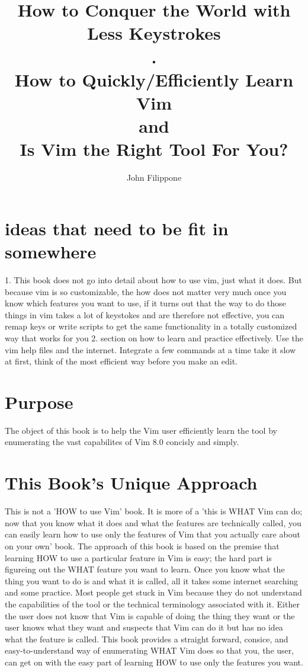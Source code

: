 \documentclass[12pt]{book}
\title{How to Conquer the World with Less Keystrokes \\.\\\large How to Quickly/Efficiently Learn Vim \\\large and \\\large Is Vim the Right Tool For You?}
\author{John Filippone}
\begin{document}
\maketitle

\section{ideas that need to be fit in somewhere}
1. This book does not go into detail about how to use vim, just what it does.  
But because vim is so customizable, the how does not matter very much
once you know which features you want to use, if it turns out that the way to do those things in vim takes a lot of keystokes and are therefore
not effective, you can remap keys or write scripts to get the same functionality in a totally customized way that works for you
2. section on how to learn and practice effectively.
Use the vim help files and the internet.
Integrate a few commands at a time take it slow at first, think of the most efficient way before you make an edit.

\section{Purpose}
The object of this book is to help the Vim user efficiently learn the tool by enumerating the vast capabilites of Vim 8.0 concisly and simply.  

\section{This Book's Unique Approach}
This is not a 'HOW to use Vim' book. 
It is more of a 'this is WHAT Vim can do; now that you know what it does and what the features are technically called, you can easily learn how to use only the features of Vim 
that you actually care about on your own' book. 
The approach of this book is based on the premise that learning HOW to use a particular feature in Vim is easy; the hard part is figureing out the WHAT feature you want to learn.  
Once you know what the thing you want to do is and what it is called, all it takes some internet searching and some practice.  
Most people get stuck in Vim because they do not understand the capabilities of the tool or the technical terminology associated with it.
Either the user does not know that Vim is capable of doing the thing they want or the user knows what they want and suspects that Vim can do it but has no idea what the feature is called.
This book provides a straight forward, consice, and easy-to-understand way of enumerating WHAT Vim does so that you, the user, can get on with the easy part of learning HOW to use only the
features you want.  
 
\end{document}
